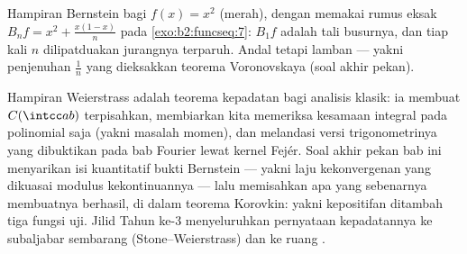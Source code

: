 \begin{omfigure}

{\small Hampiran Bernstein bagi $f(x) = x^2$ (merah), dengan memakai
rumus eksak $B_nf = x^2 + \frac{x(1-x)}{n}$ pada
\cref{exo:b2:funcseq:7}: $B_1f$ adalah tali busurnya, dan tiap kali $n$
dilipatduakan jurangnya terparuh. Andal tetapi lamban --- yakni
penjenuhan $\frac1n$ yang dieksakkan teorema Voronovskaya (soal akhir pekan).}
\end{omfigure}

\begin{remark}
Hampiran Weierstrass adalah teorema kepadatan bagi analisis
klasik: ia membuat $C(\intcc ab)$ terpisahkan, membiarkan kita memeriksa
kesamaan integral pada polinomial saja (yakni masalah momen), dan
melandasi versi trigonometrinya yang dibuktikan pada bab Fourier lewat
kernel Fejér. Soal akhir pekan bab ini menyarikan
isi kuantitatif bukti Bernstein --- yakni laju kekonvergenan yang
dikuasai modulus kekontinuannya --- lalu memisahkan apa yang sebenarnya
membuatnya berhasil, di dalam teorema Korovkin: yakni kepositifan
ditambah tiga fungsi uji. Jilid Tahun ke-3 menyeluruhkan pernyataan
kepadatannya ke subaljabar sembarang (Stone--Weierstrass) dan ke ruang .
\end{remark}


